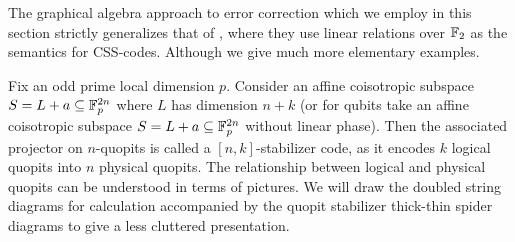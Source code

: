 The graphical algebra approach to error correction which we employ in this section strictly generalizes that of \cite{grok}, where they use linear relations over $\mathbb{F}_2$ as the semantics for CSS-codes. Although we give much more elementary examples.

Fix an odd prime local dimension  $p$.
Consider an affine coisotropic subspace $S=L+a \subseteq \mathbb{F}_p^{2n}$ where $L$ has dimension $n+k$ (or for qubits take an affine coisotropic subspace $S=L+a \subseteq \mathbb{F}_p^{2n}$ without linear phase).  Then the associated projector on $n$-quopits is called a $[n,k]$-stabilizer code, as it encodes $k$ logical quopits into $n$ physical quopits. 
The relationship between logical and physical quopits can be understood in terms of pictures.  We will draw the doubled string diagrams for calculation accompanied by the quopit stabilizer thick-thin spider diagrams to give a less cluttered presentation.

